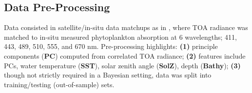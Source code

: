 \documentclass[a0,portrait]{a0poster}
\begin{document}
\begin{multicols}{2}
\subsection*{Data Pre-Processing}
Data consisted in satellite/in-situ data matchups as in \cite{Bailey:06}, where TOA radiance was matched to in-situ measured phytoplankton absorption at 6 wavelengths; 411, 443, 489, 510, 555, and 670 nm. Pre-processing highlights: \textbf{(1)} principle components (\textbf{PC}) computed from correlated TOA radiance; \textbf{(2)} features include PCs, water temperature (\textbf{SST}), solar zenith angle (\textbf{SolZ}), depth (\textbf{Bathy}); \textbf{(3)} though not strictly required in a Bayesian setting, data was split into training/testing (out-of-sample) sets.
\begin{center}
\end{center}
\end{multicols}
\end{document}
